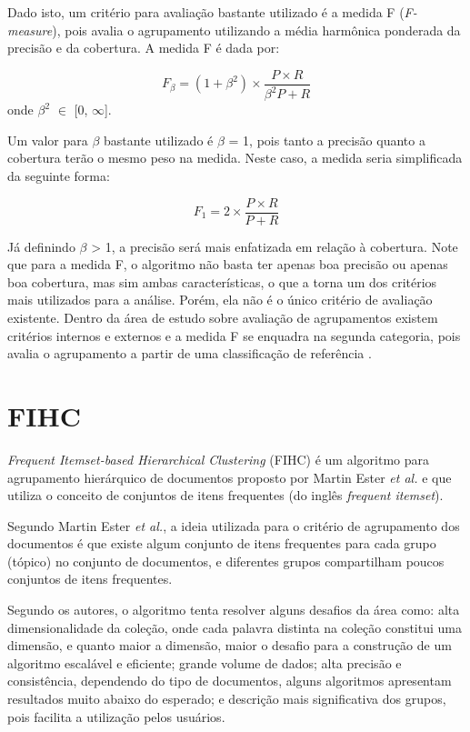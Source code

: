 \documentclass[a4paper,12pt]{article}
\begin{document}
Dado isto, um critério para avaliação bastante utilizado é a medida F (\textit{F-measure}), pois avalia o agrupamento utilizando a média harmônica ponderada da precisão e da cobertura. A medida F é dada por:

\begin{equation} F_{\beta} = (1 + \beta^2) \times \frac{P \times R} {\beta^2 P + R} \end{equation}
onde $\beta^2$ $\in$ [0, $\infty$].

Um valor para $\beta$ bastante utilizado é $\beta$ = 1, pois tanto a precisão quanto a cobertura terão o mesmo peso na medida. Neste caso, a medida seria simplificada da seguinte forma:

\begin{equation} F_{1} = 2 \times \frac{P \times R} {P + R} \end{equation}

Já definindo $\beta$ > 1, a precisão será mais enfatizada em relação à cobertura. Note que para a medida F, o algoritmo não basta ter apenas boa precisão ou apenas boa cobertura, mas sim ambas características, o que a torna um dos critérios mais utilizados para a análise. Porém, ela não é o único critério de avaliação existente. Dentro da área de estudo sobre avaliação de agrupamentos existem critérios internos e externos e a medida F se enquadra na segunda categoria, pois avalia o agrupamento a partir de uma classificação de referência \cite{Ester03}.

\newpage
\section {FIHC}
\label {sec:fihc}

\textit{Frequent Itemset-based Hierarchical Clustering} (FIHC) é um algoritmo para agrupamento hierárquico de documentos proposto por Martin Ester \textit{et al.} \cite{Ester03} e que utiliza o conceito de conjuntos de itens frequentes (do inglês \textit{frequent itemset}).

Segundo Martin Ester \textit{et al.}, a ideia utilizada para o critério de agrupamento dos documentos é que existe algum conjunto de itens frequentes para cada grupo (tópico) no conjunto de documentos, e diferentes grupos compartilham poucos conjuntos de itens frequentes.

Segundo os autores, o algoritmo tenta resolver alguns desafios da área como: alta dimensionalidade da coleção, onde cada palavra distinta na coleção constitui uma dimensão, e quanto maior a dimensão, maior o desafio para a construção de um algoritmo escalável e eficiente; grande volume de dados; alta precisão e consistência, dependendo do tipo de documentos, alguns algoritmos apresentam resultados muito abaixo do esperado; e descrição mais significativa dos grupos, pois facilita a utilização pelos usuários.
\end{document}
